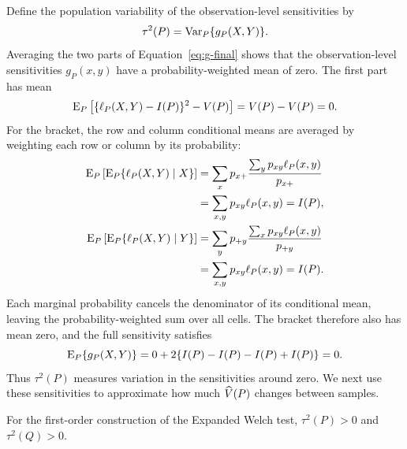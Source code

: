 Define the population variability of the observation-level sensitivities by
\begin{equation}
  \tau^2(P)=\operatorname{Var}_P\{g_P(X,Y)\}.
  \label{eq:tau-definition}
\end{equation}
Averaging the two parts of Equation~\eqref{eq:g-final} shows that the
observation-level sensitivities \(g_P(x,y)\) have a probability-weighted
mean of zero. The first part has mean
\begin{equation}
  \operatorname{E}_P\left[\{\ell_P(X,Y)-I(P)\}^2-V(P)\right]
  =V(P)-V(P)=0.
\end{equation}
For the bracket, the row and column conditional means are averaged by
weighting each row or column by its probability:
\begin{align}
  \operatorname{E}_P\left[\operatorname{E}_P\{\ell_P(X,Y)\mid X\}\right]
  &=\sum_x p_{x+}
    \frac{\sum_y p_{xy}\ell_P(x,y)}{p_{x+}}
    \notag\\
  &=\sum_{x,y}p_{xy}\ell_P(x,y)=I(P),\\
  \operatorname{E}_P\left[\operatorname{E}_P\{\ell_P(X,Y)\mid Y\}\right]
  &=\sum_y p_{+y}
    \frac{\sum_x p_{xy}\ell_P(x,y)}{p_{+y}}
    \notag\\
  &=\sum_{x,y}p_{xy}\ell_P(x,y)=I(P).
\end{align}
Each marginal probability cancels the denominator of its conditional mean,
leaving the probability-weighted sum over all cells. The bracket therefore
also has mean zero, and the full sensitivity satisfies
\begin{equation}
  \operatorname{E}_P\{g_P(X,Y)\}
  =0+2\{I(P)-I(P)-I(P)+I(P)\}=0.
\end{equation}
Thus \(\tau^2(P)\) measures variation in the sensitivities around zero.
We next use these sensitivities to approximate how much \(\widehat V(P)\)
changes between samples.

\begin{assumption}
For the first-order construction of the Expanded Welch test,
\(\tau^2(P)>0\) and \(\tau^2(Q)>0\).
\end{assumption}

